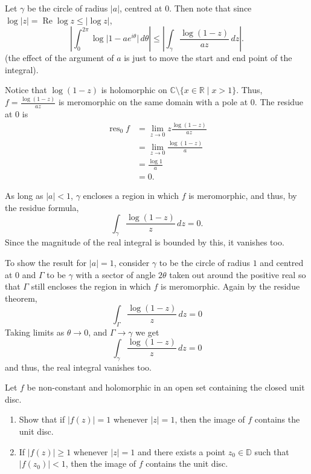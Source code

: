 \documentclass[12 pt, letterpaper]{hmcpset}
\begin{document}
\begin{solution}
	Let $\gamma$ be the circle of radius $\lvert a \rvert$, centred at $0$. Then note that since $\log \lvert z \rvert = \operatorname{Re} \log z \le \lvert \log z \rvert$,
	\[
		\left \lvert \int_{0}^{2 \pi} \log \lvert 1 - a e^{i \theta} \rvert \, d\theta \right \rvert \le \left \lvert \int_{\gamma} \frac{\log(1 - z)}{az} \, dz \right \rvert.
	\]
	(the effect of the argument of $a$ is just to move the start and end point of the integral).

	Notice that $\log(1 - z)$ is holomorphic on $\mathbb{C} \setminus \{ x \in \mathbb{R} \mid x > 1 \}$. Thus, $f = \frac{\log(1 - z)}{az}$ is meromorphic on the same domain with a pole at $0$. The residue at $0$ is
	\[
		\begin{split}
			\operatorname{res}_{0} f & = \lim_{z \to 0} z \frac{\log(1 - z)}{az} \\
						 & = \lim_{z \to 0} \frac{\log(1 - z)}{a} \\
						 & = \frac{\log 1}{a} \\
						 & = 0.
		\end{split}
	\]

	As long as $\lvert a \rvert < 1$, $\gamma$ encloses a region in which $f$ is meromorphic, and thus, by the residue formula,
	\[
		\int_{\gamma} \frac{\log(1 - z)}{z} \, dz = 0.
	\]
	Since the magnitude of the real integral is bounded by this, it vanishes too.

	To show the result for $\lvert a \rvert = 1$, consider $\gamma$ to be the circle of radius $1$ and centred at $0$ and $\Gamma$ to be $\gamma$ with a sector of angle $2 \theta$ taken out around the positive real so that $\Gamma$ still encloses the region in which $f$ is meromorphic. Again by the residue theorem,
	\[
		\int_{\Gamma} \frac{\log(1 - z)}{z}  \, dz = 0
	\]
	Taking limits as $\theta \to 0$, and $\Gamma \to \gamma$ we get
	\[
		\int_{\gamma} \frac{\log(1 - z)}{z} \, dz = 0
	\]
	and thus, the real integral vanishes too.
\end{solution}

\pagebreak

\begin{problem}[17.]
	Let $f$ be non-constant and holomorphic in an open set containing the closed unit disc.
	\begin{enumerate}
		\item Show that if $\lvert f(z) \rvert = 1$ whenever $\lvert z \rvert = 1$, then the image of $f$ contains the unit disc.
		\item If $\lvert f(z) \rvert \ge 1$ whenever $\lvert z \rvert = 1$ and there exists a point $z_{0} \in \mathbb{D}$ such that $\lvert f(z_{0}) \rvert < 1$, then the image of $f$ contains the unit disc.
	\end{enumerate}
\end{problem}
\end{document}
